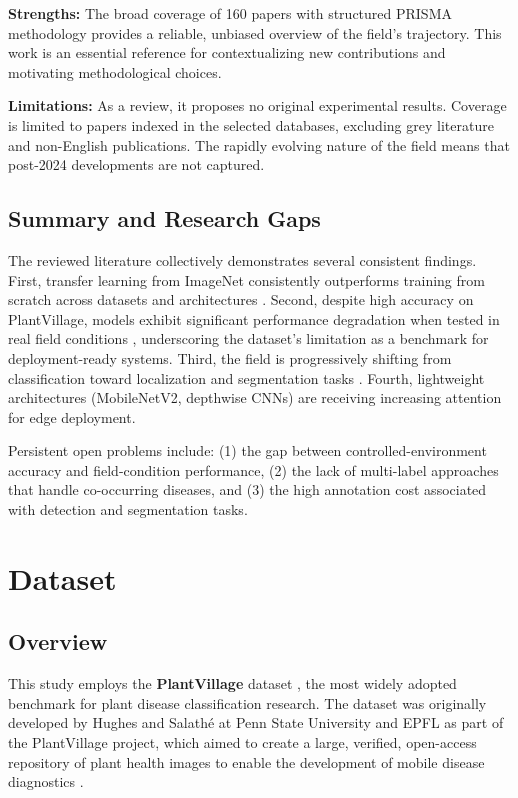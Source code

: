 \documentclass[10pt,twocolumn]{article}
\begin{document}
\textbf{Strengths:} The broad coverage of 160 papers with structured PRISMA methodology provides a reliable, unbiased overview of the field's trajectory. This work is an essential reference for contextualizing new contributions and motivating methodological choices.

\textbf{Limitations:} As a review, it proposes no original experimental results. Coverage is limited to papers indexed in the selected databases, excluding grey literature and non-English publications. The rapidly evolving nature of the field means that post-2024 developments are not captured.

\subsection{Summary and Research Gaps}

The reviewed literature collectively demonstrates several consistent findings. First, transfer learning from ImageNet consistently outperforms training from scratch across datasets and architectures \cite{Tiwari2021, Ayan2024}. Second, despite high accuracy on PlantVillage, models exhibit significant performance degradation when tested in real field conditions \cite{Frontiers2025_wild}, underscoring the dataset's limitation as a benchmark for deployment-ready systems. Third, the field is progressively shifting from classification toward localization and segmentation tasks \cite{ScientificReports2025, AIReview2024}. Fourth, lightweight architectures (MobileNetV2, depthwise CNNs) are receiving increasing attention for edge deployment.

Persistent open problems include: (1) the gap between controlled-environment accuracy and field-condition performance, (2) the lack of multi-label approaches that handle co-occurring diseases, and (3) the high annotation cost associated with detection and segmentation tasks.

\section{Dataset}

\subsection{Overview}

This study employs the \textbf{PlantVillage} dataset \cite{HughesSalathe2015, Mohanty2016}, the most widely adopted benchmark for plant disease classification research. The dataset was originally developed by Hughes and Salath\'{e} at Penn State University and EPFL as part of the PlantVillage project, which aimed to create a large, verified, open-access repository of plant health images to enable the development of mobile disease diagnostics \cite{HughesSalathe2015}.
\end{document}
